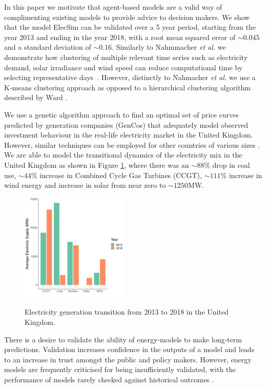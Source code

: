 \documentclass[final,3p,times,twocolumn,numbers]{elsarticle}
\begin{document}
In this paper we motivate that agent-based models are a valid way of complimenting existing models to provide advice to decision makers. We show that the model ElecSim \cite{Kell} can be validated over a 5 year period, starting from the year 2013 and ending in the year 2018, with a root mean squared error of {\color{red} $\sim0.045$} and a standard deviation of {\color{red}$\sim0.16$}. Similarly to Nahmmacher \textit{et al.} we demonstrate how clustering of multiple relevant time series such as electricity demand, solar irradiance and wind speed can reduce computational time by selecting representative days~\cite{Nahmmacher2016}. However, distinctly to Nahmacher \textit{et al.} we use a K-means clustering approach \cite{forgy65} as opposed to a hierarchical clustering algorithm described by Ward \cite{doi:10.1080/01621459.1963.10500845}.

We use a genetic algorithm approach to find an optimal set of price curves predicted by generation companies (GenCos) that  adequately model observed investment behaviour in the real-life electricity market in the United Kingdom. However, similar techniques can be employed for other countries of various sizes \cite{Kell}. We are able to model the transitional dynamics of the electricity mix in the United Kingdom as shown in Figure \ref{uk_historical_mix}, where there was an $\sim88\%$ drop in coal use, $\sim44\%$ increase in Combined Cycle Gas Turbines (CCGT), $\sim111\% $ increase in wind energy and increase in solar from near zero to $\sim 1250$MW.


\begin{figure}
\centering
\includegraphics[width=0.46\textwidth]{figures/introduction/uk_historical_mix.pdf}
\label{uk_historical_mix}
\caption{Electricity generation transition from 2013 to 2018 in the United Kingdom.}
\end{figure}

There is a desire to validate the ability of energy-models to make long-term predictions. Validation increases confidence in the outputs of a model and leads to an increase in trust amongst the public and policy makers. However, energy models are frequently criticised for being insufficiently validated, with the performance of models rarely checked against historical outcomes \cite{Beckman2011}.
\end{document}
